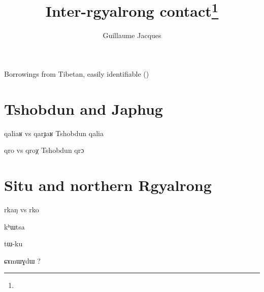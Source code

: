 \documentclass[oldfontcommands,oneside,a4paper,11pt]{article}
\newcommand{\ipa}[1]{{\phon \mbox{#1}}} %
\begin{document}
 
\title{Inter-rgyalrong contact\footnote{
} }
\author{Guillaume Jacques}
\maketitle
\linenumbers


Borrowings from Tibetan, easily identifiable (\citealt{jacques04these})


\section{Tshobdun and Japhug}
\ipa{qaliaʁ} vs \ipa{qarɟaʁ}  Tshobdun \ipa{qalia}

\ipa{qro} vs \ipa{qroχ}  Tshobdun \ipa{qrɔ}

\section{Situ and northern Rgyalrong}
\ipa{rkaŋ} vs \ipa{rko}

\ipa{kʰɯtsa} 

\ipa{tɯ-ku} 

\ipa{ɕɤmɯɣdɯ} ?

  

\end{document}
